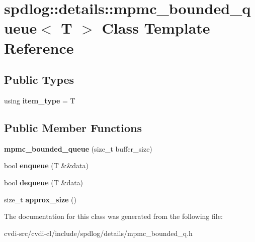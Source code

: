 \hypertarget{classspdlog_1_1details_1_1mpmc__bounded__queue}{}\section{spdlog\+:\+:details\+:\+:mpmc\+\_\+bounded\+\_\+queue$<$ T $>$ Class Template Reference}
\label{classspdlog_1_1details_1_1mpmc__bounded__queue}
\subsection*{Public Types}
\begin{DoxyCompactItemize}
\item 
using {\bfseries item\+\_\+type} = T\hypertarget{classspdlog_1_1details_1_1mpmc__bounded__queue_a031988ff55da961ad0cd1df08c9112b5}{}\label{classspdlog_1_1details_1_1mpmc__bounded__queue_a031988ff55da961ad0cd1df08c9112b5}

\end{DoxyCompactItemize}
\subsection*{Public Member Functions}
\begin{DoxyCompactItemize}
\item 
{\bfseries mpmc\+\_\+bounded\+\_\+queue} (size\+\_\+t buffer\+\_\+size)\hypertarget{classspdlog_1_1details_1_1mpmc__bounded__queue_ab624df4f131d8b943bf8c451e643ddcb}{}\label{classspdlog_1_1details_1_1mpmc__bounded__queue_ab624df4f131d8b943bf8c451e643ddcb}

\item 
bool {\bfseries enqueue} (T \&\&data)\hypertarget{classspdlog_1_1details_1_1mpmc__bounded__queue_a61b70c6eee62cea308127373bdc9deee}{}\label{classspdlog_1_1details_1_1mpmc__bounded__queue_a61b70c6eee62cea308127373bdc9deee}

\item 
bool {\bfseries dequeue} (T \&data)\hypertarget{classspdlog_1_1details_1_1mpmc__bounded__queue_a97ff1f28e98db6c55970843d6193c047}{}\label{classspdlog_1_1details_1_1mpmc__bounded__queue_a97ff1f28e98db6c55970843d6193c047}

\item 
size\+\_\+t {\bfseries approx\+\_\+size} ()\hypertarget{classspdlog_1_1details_1_1mpmc__bounded__queue_ab9c60fc728432e81d18a07cccc8d4ad7}{}\label{classspdlog_1_1details_1_1mpmc__bounded__queue_ab9c60fc728432e81d18a07cccc8d4ad7}

\end{DoxyCompactItemize}


The documentation for this class was generated from the following file\+:\begin{DoxyCompactItemize}
\item 
cvdi-\/src/cvdi-\/cl/include/spdlog/details/mpmc\+\_\+bounded\+\_\+q.\+h\end{DoxyCompactItemize}
